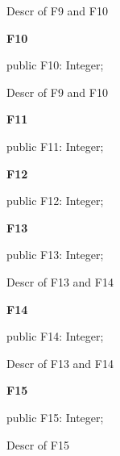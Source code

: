 \documentclass{report}
\newif\ifpdf
\begin{document}
\begin{list}{}
\par Descr of F9 and F10\label{ok_multiple_fields.TRec1-F10}
\item[\textbf{F10}\hfill]
\ifpdf
\begin{flushleft}
\fi
\begin{ttfamily}
public F10: Integer;\end{ttfamily}

\ifpdf
\end{flushleft}
\fi


\par Descr of F9 and F10\label{ok_multiple_fields.TRec1-F11}
\item[\textbf{F11}\hfill]
\ifpdf
\begin{flushleft}
\fi
\begin{ttfamily}
public F11: Integer;\end{ttfamily}

\ifpdf
\end{flushleft}
\fi


\par  \label{ok_multiple_fields.TRec1-F12}
\item[\textbf{F12}\hfill]
\ifpdf
\begin{flushleft}
\fi
\begin{ttfamily}
public F12: Integer;\end{ttfamily}

\ifpdf
\end{flushleft}
\fi


\par  \label{ok_multiple_fields.TRec1-F13}
\item[\textbf{F13}\hfill]
\ifpdf
\begin{flushleft}
\fi
\begin{ttfamily}
public F13: Integer;\end{ttfamily}

\ifpdf
\end{flushleft}
\fi


\par Descr of F13 and F14\label{ok_multiple_fields.TRec1-F14}
\item[\textbf{F14}\hfill]
\ifpdf
\begin{flushleft}
\fi
\begin{ttfamily}
public F14: Integer;\end{ttfamily}

\ifpdf
\end{flushleft}
\fi


\par Descr of F13 and F14\label{ok_multiple_fields.TRec1-F15}
\item[\textbf{F15}\hfill]
\ifpdf
\begin{flushleft}
\fi
\begin{ttfamily}
public F15: Integer;\end{ttfamily}

\ifpdf
\end{flushleft}
\fi


\par Descr of F15\end{list}
\ifpdf
\end{document}
